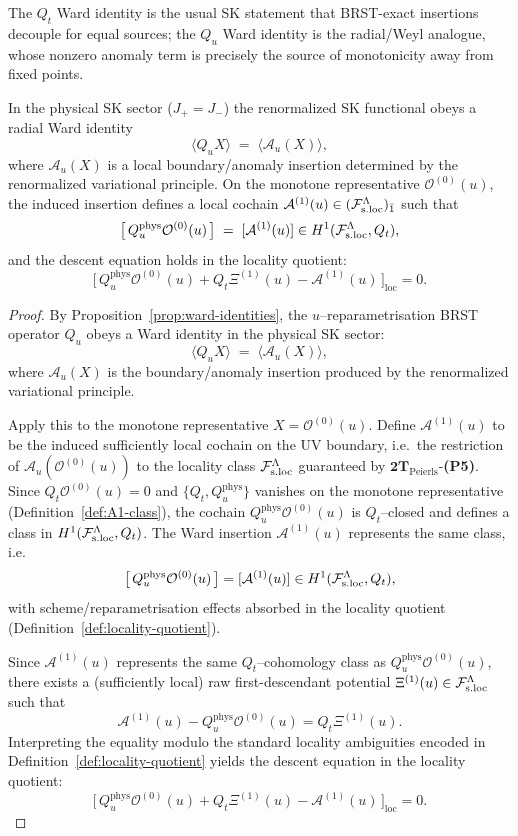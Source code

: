 \begin{remark}
The $Q_t$ Ward identity is the usual SK statement that BRST-exact insertions
decouple for equal sources; the $Q_u$ Ward identity is the radial/Weyl analogue,
whose nonzero anomaly term is precisely the source of monotonicity away from
fixed points.
\end{remark}

\begin{proposition}
\label{prop:A1-from-SK}
In the physical SK sector ($J_+=J_-$) the renormalized SK functional obeys a radial Ward identity
\[
\langle Q_u X\rangle \;=\; \langle \mathcal A_u(X)\rangle,
\]
where $\mathcal A_u(X)$ is a local boundary/anomaly insertion determined by the
renormalized variational principle.  On the monotone representative $\mathcal O^{(0)}(u)$,
the induced insertion defines a local cochain $\mathcal A^{(1)}(u)\in(\mathcal F_{\mathrm{s.loc}}^\Lambda)_{\bar 1}$ such that
\[
\big[\,Q_u^{\mathrm{phys}}\mathcal O^{(0)}(u)\,\big] \;=\; [\mathcal A^{(1)}(u)]\in H^1(\mathcal F_{\mathrm{s.loc}}^\Lambda,Q_t),
\]
and the descent equation holds in the locality quotient:
\[
\big[\,Q_u^{\mathrm{phys}}\mathcal O^{(0)}(u)+Q_t\Xi^{(1)}(u)-\mathcal A^{(1)}(u)\,\big]_{\mathrm{loc}}=0.
\]
\end{proposition}

\begin{proof}
By Proposition~\ref{prop:ward-identities}, the $u$--reparametrisation BRST
operator $Q_u$ obeys a Ward identity in the physical SK sector:
\[
\langle Q_u X\rangle \;=\; \langle \mathcal A_u(X)\rangle,
\]
where $\mathcal A_u(X)$ is the boundary/anomaly insertion produced by the
renormalized variational principle.

Apply this to the monotone representative $X=\mathcal O^{(0)}(u)$.
Define $\mathcal A^{(1)}(u)$ to be the induced sufficiently local cochain on
the UV boundary, i.e.\ the restriction of $\mathcal A_u(\mathcal O^{(0)}(u))$ to
the locality class $\mathcal F_{\mathrm{s.loc}}^\Lambda$ guaranteed by $\mathbf{2T}_{\mathrm{Peierls}}$-\textbf{(P5)}.
Since $Q_t\mathcal O^{(0)}(u)=0$ and $\{Q_t,Q_u^{\mathrm{phys}}\}$ vanishes on
the monotone representative (Definition~\ref{def:A1-class}), the cochain
$Q_u^{\mathrm{phys}}\mathcal O^{(0)}(u)$ is $Q_t$--closed and defines a class in
$H^1(\mathcal F_{\mathrm{s.loc}}^\Lambda,Q_t)$.
The Ward insertion $\mathcal A^{(1)}(u)$ represents the same class, i.e.
\[
\big[\,Q_u^{\mathrm{phys}}\mathcal O^{(0)}(u)\,\big]=[\mathcal A^{(1)}(u)]\in H^1(\mathcal F_{\mathrm{s.loc}}^\Lambda,Q_t),
\]
with scheme/reparametrisation effects absorbed in the locality quotient
(Definition~\ref{def:locality-quotient}).

Since $\mathcal A^{(1)}(u)$ represents the same $Q_t$--cohomology class as
$Q_u^{\mathrm{phys}}\mathcal O^{(0)}(u)$, there exists a (sufficiently local)
raw first-descendant potential \(\Xi^{(1)}(u)\in\mathcal F_{\mathrm{s.loc}}^\Lambda\) such that
\[
\mathcal A^{(1)}(u)-Q_u^{\mathrm{phys}}\mathcal O^{(0)}(u)=Q_t\Xi^{(1)}(u).
\]
Interpreting the equality modulo the standard locality ambiguities encoded in
Definition~\ref{def:locality-quotient} yields the descent equation in the
locality quotient:
\[
\big[\,Q_u^{\mathrm{phys}}\mathcal O^{(0)}(u)+Q_t\Xi^{(1)}(u)-\mathcal A^{(1)}(u)\,\big]_{\mathrm{loc}}=0.
\]
\end{proof}

